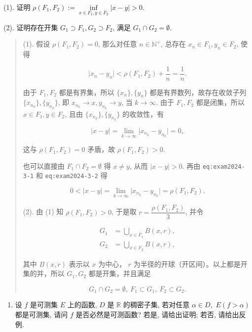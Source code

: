 \documentclass[
]{article}
\providecommand{\tightlist}{%
  \setlength{\itemsep}{0pt}\setlength{\parskip}{0pt}}
\begin{document}
(1). 证明
\(\rho(F_1, F_2) := \inf\limits_{x\in F_1, y\in F_2} \lvert x - y \rvert > 0\).

(2). 证明存在开集 \(G_1 \supset F_1, G_2 \supset F_2\), 满足
\(G_1 \cap G_2 = \emptyset\).

\begin{quote}
(1). 假设 \(\rho(F_1, F_2) = 0\), 那么对任意 \(n \in \mathbb{N}^+\),
总存在 \(x_n \in F_1, y_n \in F_2\), 使得

{\[\lvert x_n - y_n \rvert < \rho(F_1, F_2) + \dfrac{1}{n} = \dfrac{1}{n}.\]}

由于 \(F_1, F_2\) 都是有界集，所以 \(\{x_n\}, \{y_n\}\)
都是有界数列，故存在收敛子列 \(\{x_{n_k}\}, \{y_{n_k}\}\), 即
\(x_{n_k} \to x, y_{n_k} \to y\), 当 \(k \to \infty\). 由于 \(F_1, F_2\)
都是闭集，所以 \(x \in F_1, y \in F_2\), 且由
\(\{x_{n_k}\}, \{y_{n_k}\}\) 的收敛性，有

{\[\lvert x - y \rvert = \lim\limits_{k\to\infty} \lvert x_{n_k} - y_{n_k} \rvert = 0,\]}

这与 \(\rho(F_1, F_2) = 0\) 矛盾，故 \(\rho(F_1, F_2) > 0\).

也可以直接由 \(F_1 \cap F_2 = \emptyset\) 得 \(x \neq y\), 从而
\(\lvert x - y \rvert > 0\). 再由 \texttt{eq:exam2024-3-1} 和
\texttt{eq:exam2024-3-2} 得

\[0 < \lvert x - y \rvert = \lim\limits_{k\to\infty} \lvert x_{n_k} - y_{n_k} \rvert = \rho(F_1, F_2).\]

(2). 由 (1) 知 \(\rho(F_1, F_2) > 0\), 于是取
\(r = \dfrac{\rho(F_1, F_2)}{3}\), 并令

\[\begin{aligned}
G_1 & = \bigcup\limits_{x\in F_1} B(x, r), \\
G_2 & = \bigcup\limits_{x\in F_2} B(x, r),
\end{aligned}\]

其中 \(B(x, r)\) 表示以 \(x\) 为中心， \(r\)
为半径的开球（开区间）。以上都是开集的并，所以 \(G_1, G_2\)
都是开集，并且满足

\[G_1 \cap G_2 = \emptyset, ~ F_1 \subset G_1, ~ F_2 \subset G_2.\]
\end{quote}

\begin{enumerate}
\def\labelenumi{\arabic{enumi}.}
\setcounter{enumi}{1}
\tightlist
\item
  设 \(f\) 是可测集 \(E\) 上的函数, \(D\) 是 \(\mathbb{R}\) 的稠密子集,
  若对任意 \(\alpha\in D,\) \(E(f > \alpha)\) 都是可测集, 请问 \(f\)
  是否必然是可测函数? 若是, 请给出证明; 若否, 请给出反例.
\end{enumerate}
\end{document}
